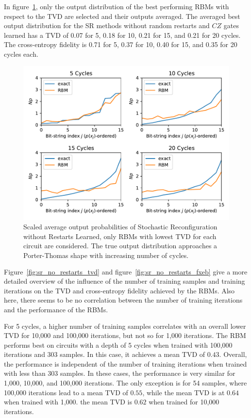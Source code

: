 In figure~\ref{fig:sr_no_restarts_bestPDF}, only the output distribution of the best performing RBMs with respect to the 
TVD are selected and their outputs averaged. The averaged best output distribution for the SR methods without 
random restarts and $CZ$ gates learned has a TVD of 0.07 for 5, 0.18 for 10, 0.21 for 15, and 0.21 for 20 
cycles. The cross-entropy fidelity is 0.71 for 5, 0.37 for 10, 0.40 for 15, and 0.35 for 20 cycles each. 

\begin{figure}[H]
  \centering
  \includegraphics[width=\textwidth]{figures/results/SR-no-restarts-learned/avgBestPDF.pdf}
  \caption[Averaged best performing scaled output probabilities of Stochastic Reconfiguration without Restarts Learned]{
    Scaled average output probabilities of Stochastic Reconfiguration without Restarts Learned, only RBMs with lowest
    TVD for each circuit are considered. The true 
    output distribution approaches a Porter-Thomas shape with increasing number of cycles.}
  \label{fig:sr_no_restarts_bestPDF}
\end{figure}

Figure~\ref{fig:sr_no_restarts_tvd} and figure~\ref{fig:sr_no_restarts_fxeb} give a more detailed overview of the influence of the 
number of training samples and training iterations on the TVD and cross-entropy fidelity achieved by 
the RBMs. Also here, there seems to be no correlation between the number of training
iterations and the performance of the RBMs. 

For 5 cycles, a higher number of training samples 
correlates with an overall lower TVD for 10,000 and 100,000 iterations, but not so for 1,000 iterations. The RBM performs best on 
circuits with a depth of 5 cycles when trained with 100,000 iterations and 303 samples. In this case, 
it achieves a mean TVD of $0.43$. Overall, the performance is independent of the number of 
training iterations when trained with less than 303 samples. In these cases, the performance is very 
similar for 1,000, 10,000, and 100,000 iterations. The only exception is for 54 samples, where 100,000 iterations lead to a 
mean TVD of $0.55$, while the mean TVD is at $0.64$ when trained with 1,000. the mean TVD is $0.62$ when trained for 
10,000 iterations. 

